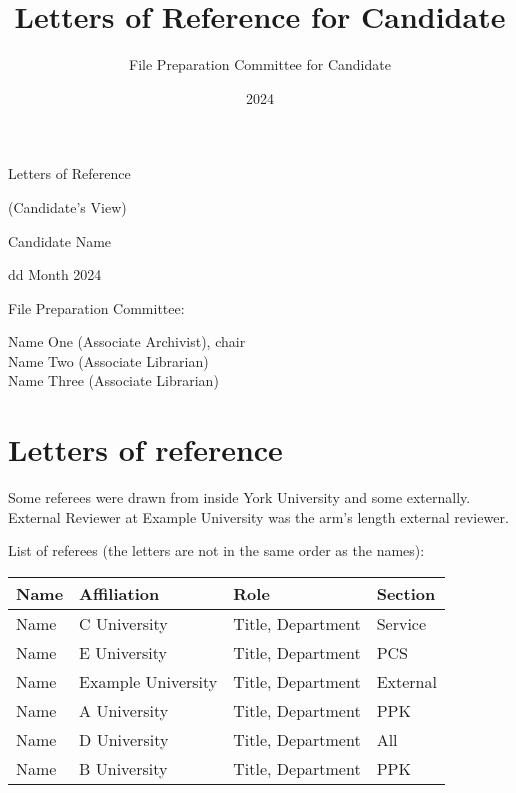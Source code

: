 \documentclass[12pt,oneside]{book}
\title{Letters of Reference for Candidate}
\author{File Preparation Committee for Candidate}
\date{2024}
\begin{document}
\begin{titlepage}

  \null\vfill

  \begin{center}

    {\Huge Letters of Reference

      \vspace{\baselineskip}

      (Candidate's View)
    }

    \vspace{2cm}

    {\Large Candidate Name }
    \vspace{1cm}

    {\large dd Month 2024 }

\end{center}

\vfill
\vfill

{\large
  File Preparation Committee:

  Name One (Associate Archivist), chair \\
  \indent Name Two (Associate Librarian) \\
  \indent Name Three (Associate Librarian)

}

\hfill

\end{titlepage}

\tableofcontents
\markboth{}{}

\chapter{Letters of reference}

Some referees were drawn from inside York University and some externally.  External Reviewer at Example University was the arm's length external reviewer.

\vspace{3cm}

List of referees (the letters are not in the same order as the names):

\vspace{1cm}


\begin{tabular}{l >{\raggedright}p{4cm} >{\raggedright}p{6cm} l}
  Name & Affiliation & Role & Section \\
  \toprule
  Name & C University & Title, Department & Service \\
  Name & E University & Title, Department & PCS \\
  Name & Example University & Title, Department & External \\
  Name & A University & Title, Department & PPK \\
  Name & D University & Title, Department & All \\
  Name & B University & Title, Department & PPK \\
  \end{tabular}
\end{document}
